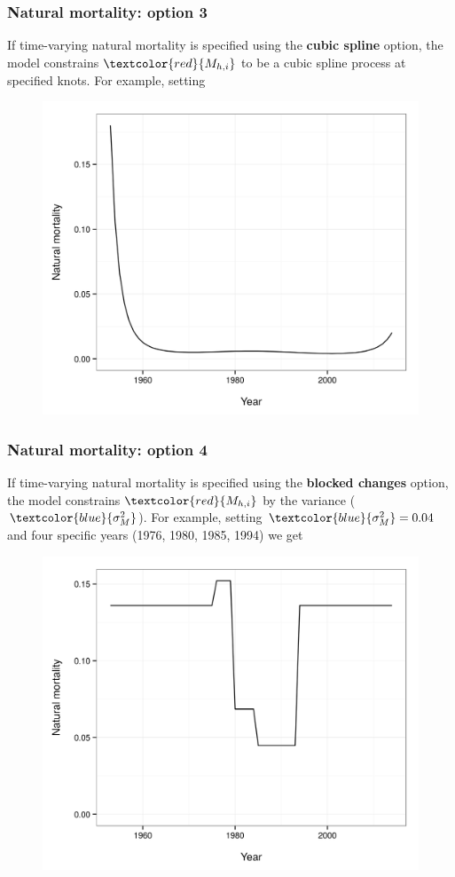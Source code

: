 \documentclass{beamer}
\begin{document}
\begin{frame}
\frametitle{Natural mortality: option 3}
If time-varying natural mortality is specified using the {\bf cubic spline}
option, the model constrains $\textcolor{red}{M_{h,i}}$ to be a cubic spline process at
specified knots. For example, setting
\begin{figure}[!htbp]
  \centering
  \includegraphics[width=0.65\linewidth]{figure/M_t_spline.png}
\end{figure}
\end{frame}


\begin{frame}
\frametitle{Natural mortality: option 4}
If time-varying natural mortality is specified using the {\bf blocked changes}
option, the model constrains $\textcolor{red}{M_{h,i}}$ by the variance
($\textcolor{blue}{\sigma^2_M}$). For example, setting
$\textcolor{blue}{\sigma^2_M} = 0.04$ and four specific years (1976, 1980, 1985,
1994) we get
\begin{figure}[!htbp]
  \centering
  \includegraphics[width=0.65\linewidth]{figure/M_t_block.png}
\end{figure}
\end{frame}
\end{document}
